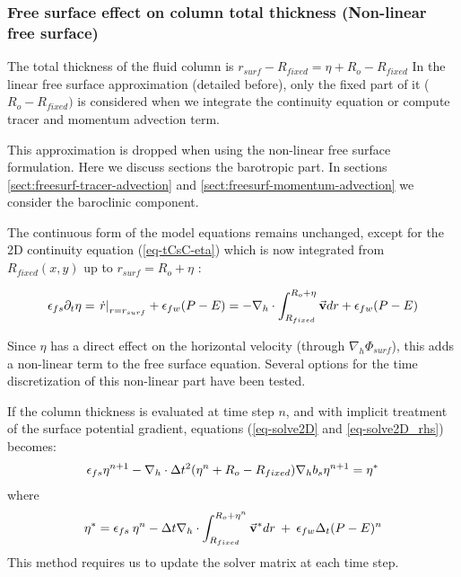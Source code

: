 \subsubsection{Free surface effect on column total thickness
(Non-linear free surface)}

The total thickness of the fluid column is $r_{surf} - R_{fixed} =
\eta + R_o - R_{fixed}$ In the linear free surface approximation
(detailed before), only the fixed part of it ($R_o - R_{fixed})$ is
considered when we integrate the continuity equation or compute tracer
and momentum advection term.

This approximation is dropped when using the non-linear free surface
formulation.  Here we discuss sections the barotropic part. In
sections \ref{sect:freesurf-tracer-advection} and
\ref{sect:freesurf-momentum-advection} we consider the baroclinic
component.


The continuous form of the model equations remains unchanged, except
for the 2D continuity equation (\ref{eq-tCsC-eta}) which is now
integrated from $R_{fixed}(x,y)$ up to $r_{surf}=R_o+\eta$ :

\begin{displaymath}
\epsilon_{fs} \partial_t \eta =
\left. \dot{r} \right|_{r=r_{surf}} + \epsilon_{fw} (P-E) =
- {\bf \nabla}_h \cdot \int_{R_{fixed}}^{R_o+\eta} \vec{\bf v} dr
+ \epsilon_{fw} (P-E)
\end{displaymath}

Since $\eta$ has a direct effect on the horizontal velocity (through
$\nabla_h \Phi_{surf}$), this adds a non-linear term to the free
surface equation. Several options for the time discretization of this
non-linear part have been tested.

If the column thickness is evaluated at time step $n$, and with
implicit treatment of the surface potential gradient, equations
(\ref{eq-solve2D} and \ref{eq-solve2D_rhs}) becomes:
\begin{eqnarray*}
\epsilon_{fs} {\eta}^{n+1} -
{\bf \nabla}_h \cdot \Delta t^2 (\eta^{n}+R_o-R_{fixed})
{\bf \nabla}_h b_s {\eta}^{n+1}
= {\eta}^*
\end{eqnarray*}
where
\begin{eqnarray*}
{\eta}^* = \epsilon_{fs} \: {\eta}^{n} -
\Delta t {\bf \nabla}_h \cdot \int_{R_{fixed}}^{R_o+\eta^n} \vec{\bf v}^* dr
\: + \: \epsilon_{fw} \Delta_t (P-E)^{n}
\end{eqnarray*} 
This method requires us to update the solver matrix at each time step.


